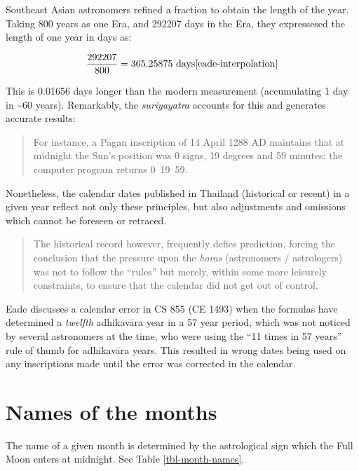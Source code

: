 \documentclass[11pt,oneside]{memoir-article}
\begin{document}
Southeast Asian astronomers refined a fraction to obtain the length of the year.
Taking 800 years as one Era, and 292207 days in the Era, they expressesed the
length of one year in days as:

\begin{equation}
\frac{292207}{800} = 365.25875\ \text{days}\cite{eade-interpolation}
\end{equation}

This is 0.01656 days longer than the modern measurement (accumulating
1 day in \textasciitilde{}60 years). Remarkably, the \emph{suriyayatra} accounts for this
and generates accurate results:

\begin{quote}
For instance, a Pagan inscription of 14 April 1288 AD maintains that
at midnight the Sun's position was 0 signs, 19 degrees and 59 minutes:
the computer program returns
0~19~59.\cite{eade1995calendrical}
\end{quote}

Nonetheless, the calendar dates published in Thailand (historical or
recent) in a given year reflect not only these principles, but also
adjustments and omissions which cannot be foreseen or retraced.

\begin{quote}
The historical record however, frequently defies prediction, forcing
the conclusion that the pressure upon the \emph{horas} (astronomers /
astrologers) was not to follow the ``rules'' but merely, within some
more leisurely constraints, to ensure that the calendar did not get
out of control.\cite{eade1995calendrical}
\end{quote}

Eade discusses a calendar error in CS 855 (CE 1493) when the formulas have
determined a \emph{twelfth} adhikavāra year in a 57 year period, which was not
noticed by several astronomers at the time, who were using the ``11 times in 57
years'' rule of thumb for adhikavāra years. This resulted in wrong dates being
used on any inscriptions made until the error was corrected in the
calendar.\cite{eade2007irregular}

\section{Names of the months}
\label{sec-3-1}

The name of a given month is determined by the astrological sign which
the Full Moon enters at midnight. See Table \ref{tbl-month-names}.
\end{document}
